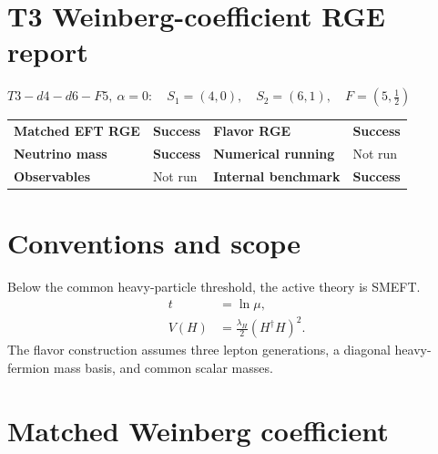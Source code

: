 \documentclass[10pt]{article}
\begin{document}
\section*{T3 Weinberg-coefficient RGE report}
\noindent $T3-d4-d6-F5,\ \alpha=0:\quad S_1=(4,0),\quad S_2=(6,1),\quad F=(5,\frac{1}{2})$
\par\medskip
\begin{center}
\begin{tabular}{>{\bfseries}l l >{\bfseries}l l}
\toprule
Matched EFT RGE & \textcolor{green!45!black}{\textbf{Success}} & Flavor RGE & \textcolor{green!45!black}{\textbf{Success}} \\
Neutrino mass & \textcolor{green!45!black}{\textbf{Success}} & Numerical running & \textcolor{black!55}{Not run} \\
Observables & \textcolor{black!55}{Not run} & Internal benchmark & \textcolor{green!45!black}{\textbf{Success}} \\
\bottomrule
\end{tabular}
\end{center}
\section{Conventions and scope}
Below the common heavy-particle threshold, the active theory is SMEFT.
\begin{align*}
t&=\ln\mu,\\
V(H)&=\frac{\lambda_H}{2}(H^\dagger H)^2.
\end{align*}
The flavor construction assumes three lepton generations, a diagonal heavy-fermion mass basis, and common scalar masses.
\section{Matched Weinberg coefficient}
\noindent{}\par
\smallskip
\end{document}
